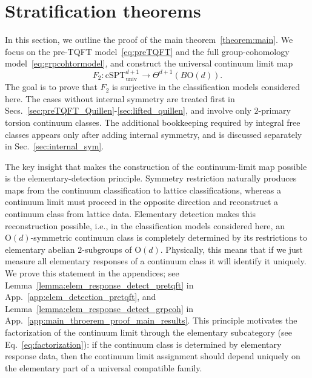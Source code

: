 \documentclass[aps,prx,reprint,superscriptaddress,twocolumn,amsmath,amssymb,amsfonts, nofootinbib]{revtex4-2}
\theoremstyle{apsstyle}
\begin{document}
\section{Stratification theorems}
\label{sec:rigor} 

In this section, we outline the proof of the main theorem~\ref{theorem:main}.
We focus on the pre-TQFT model~\eqref{eq:preTQFT} and the full group-cohomology model~\eqref{eq:grpcohtormodel}, and construct the universal continuum limit map 
\begin{equation*} F_{2}: \mathrm{cSPT}^{d+1}_{\mathrm{univ}} \longrightarrow \Theta^{d+1}(B\mathrm{O}(d)). \end{equation*} 
The goal is to prove that $F_{2}$ is surjective in the classification models considered here. The cases without internal symmetry are treated first in Secs.~\ref{sec:preTQFT_Quillen}-\ref{sec:lifted_quillen}, and involve only $2$-primary torsion continuum classes. The additional bookkeeping required by integral free classes appears only after adding internal symmetry, and is discussed separately in Sec.~\ref{sec:internal_sym}.



\bigskip 

The key insight that makes the construction of the continuum-limit map possible is the elementary-detection principle. Symmetry restriction naturally produces maps from the continuum classification to lattice classifications, whereas a continuum limit must proceed in the opposite direction and reconstruct a continuum class from lattice data. Elementary detection makes this reconstruction possible, i.e.,
in the classification models considered here, an $\mathrm{O}(d)$-symmetric continuum class is completely determined by its restrictions to elementary abelian $2$-subgroups of $\mathrm{O}(d)$. Physically, this means that if we just measure all elementary responses of a continuum class it will identify it uniquely. We prove this statement in the appendices; see Lemma~\ref{lemma:elem_response_detect_pretqft} in App.~\ref{app:elem_detection_pretqft}, and Lemma~\ref{lemma:elem_response_detect_grpcoh} in App.~\ref{app:main_throerem_proof_main_results}. This principle motivates the factorization of the continuum limit through the elementary subcategory (see Eq.~\ref{eq:factorization}): if the continuum class is determined by elementary response data, then the continuum limit assignment should depend uniquely on the elementary part of a universal compatible family.

\bigskip 
\end{document}
